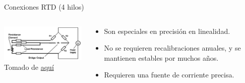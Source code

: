 \documentclass[aspectratio=169]{beamer}
\begin{document}
\begin{frame}{Conexiones RTD (4 hilos)}
    \begin{columns}[c, onlytextwidth]
        \begin{column}{0.45\textwidth}
        \includegraphics[width=6.5cm]{fig/4hilosRTD.PNG}
            \\ \tiny{Tomado de \href{http://www.bearingsensor.com/bearing-rtd.html}{aquí}}
            
        \end{column}
    \begin{column}{0.55\textwidth}
            \begin{itemize}
                \item Son especiales en precisión en linealidad.      
                \item No se requieren recalibraciones anuales, y se mantienen estables por muchos años. 
                \item Requieren una fuente de corriente precisa. 
            \end{itemize}
        \end{column}
        
    \end{columns}
\end{frame}
\end{document}
